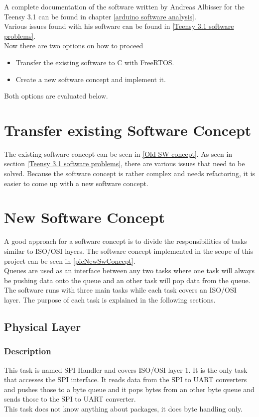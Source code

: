 %
A complete documentation of the software written by Andreas Albisser for the Teensy 3.1 can be found in chapter \ref{arduino software analysis}.\\
Various issues found with his software can be found in \ref{Teensy 3.1 software problems}.\\
Now there are two options on how to proceed
\begin{itemize}
    \item Transfer the existing software to C with FreeRTOS.
    \item Create a new software concept and implement it.
\end{itemize}
Both options are evaluated below.
%
%
\section{Transfer existing Software Concept}
The existing software concept can be seen in \autoref{Old SW concept}. As seen in section \ref{Teensy 3.1 software problems}, there are various issues that need to be solved. Because the software concept is rather complex and needs refactoring, it is easier to come up with a new software concept.
%
\section{New Software Concept}%
%
%
A good approach for a software concept is to divide the responsibilities of tasks similar to ISO/OSI layers. 
The software concept implemented in the scope of this project can be seen in \autoref{picNewSwConcept}.\\
Queues are used as an interface between any two tasks where one task will always be pushing data onto the queue and an other task will pop data from the queue.\\
The software runs with three main tasks while each task covers an ISO/OSI layer. The purpose of each task is explained in the following sections.
%
%
\subsection{Physical Layer}
\subsubsection{Description}
This task is named SPI Handler and covers ISO/OSI layer 1. It is the only task that accesses the SPI interface. It reads data from the SPI to UART converters and pushes those to a byte queue and it pops bytes from an other byte queue and sends those to the SPI to UART converter.\\
This task does not know anything about packages, it does byte handling only.
